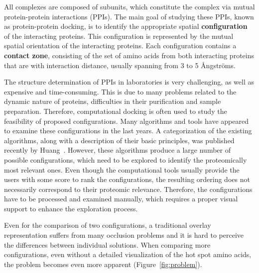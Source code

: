 \documentclass[twocolumn]{bmcart}%
\begin{document}
All complexes are composed of subunits, which constitute the complex via mutual protein-protein interactions (PPIs).
The main goal of studying these PPIs, known as protein-protein docking, is to identify the appropriate spatial \textbf{configuration} of the interacting proteins.
This configuration is represented by the mutual spatial orientation of the interacting proteins.
Each configuration contains a \textbf{contact zone}, consisting of the set of amino acids from both interacting proteins that are with interaction distance, usually spanning from 3 to 5 \AA ngstr\"{o}ms.

The structure determination of PPIs in laboratories is very challenging, as well as expensive and time-consuming.
This is due to many problems related to the dynamic nature of proteins, difficulties in their purification and sample preparation.
Therefore, computational docking is often used to study the feasibility of proposed configurations.
Many algorithms and tools have appeared to examine these configurations in the last years.
A categorization of the existing algorithms, along with a description of their basic principles, was published recently by Huang~\cite{Huang2014}.
However, these algorithms produce a large number of possible configurations, which need to be explored to identify the proteomically most relevant ones.
Even though the computational tools usually provide the users with some score to rank the configurations, the resulting ordering does not necessarily correspond to their proteomic relevance.
Therefore, the configurations have to be processed and examined manually, which requires a proper visual support to enhance the exploration process.

Even for the comparison of two configurations, a traditional overlay representation suffers from many occlusion problems and it is hard to perceive the differences between individual solutions.
When comparing more configurations, even without a detailed visualization of the hot spot amino acids, the problem becomes even more apparent (Figure~\ref{fig:problem}).
\end{document}
